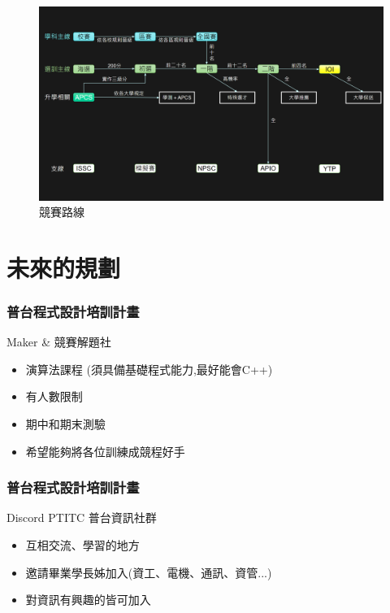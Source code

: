 \documentclass[mathserif]{beamer}
\begin{document}
    \begin{frame}
        \begin{figure}[H]
            \centering
            \includegraphics[width=1\textwidth]{contest} 
            \caption{競賽路線}
        \end{figure}
    \end{frame}

        \section{未來的規劃}

    \begin{frame}
        \frametitle{普台程式設計培訓計畫}
        Maker \& 競賽解題社
        \begin{itemize}
            \item 演算法課程 (須具備基礎程式能力,最好能會C++)
            \pause
            \item 有人數限制
            \pause
            \item 期中和期末測驗
            \pause
            \item 希望能夠將各位訓練成競程好手
        \end{itemize}
    \end{frame}

    \begin{frame}
        \frametitle{普台程式設計培訓計畫}
        Discord PTITC 普台資訊社群
        \begin{itemize}
            \item 互相交流、學習的地方
            \pause
            \item 邀請畢業學長姊加入(資工、電機、通訊、資管...)
            \pause
            \item 對資訊有興趣的皆可加入
        \end{itemize}
    \end{frame}
\end{document}

